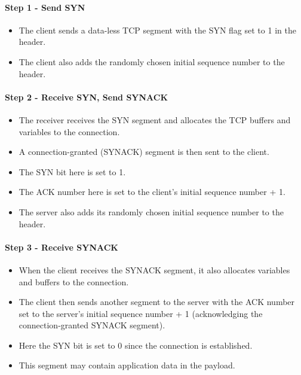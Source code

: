 \documentclass{article}
\begin{document}
\paragraph{Step 1 - Send SYN}

\begin{itemize}
    \item The client sends a data-less TCP segment with the SYN flag set to 1 in the header.
    \item The client also adds the randomly chosen initial sequence number to the header.
\end{itemize}

\paragraph{Step 2 - Receive SYN, Send SYNACK}

\begin{itemize}
    \item The receiver receives the SYN segment and allocates the TCP buffers and variables to the connection.
    \item A connection-granted (SYNACK) segment is then sent to the client.
    \item The SYN bit here is set to 1.
    \item The ACK number here is set to the client's initial sequence number + 1.
    \item The server also adds its randomly chosen initial sequence number to the header.
\end{itemize}

\paragraph{Step 3 - Receive SYNACK}

\begin{itemize}
    \item When the client receives the SYNACK segment, it also allocates variables and buffers to the connection.
    \item The client then sends another segment to the server with the ACK number set to the server's initial sequence number + 1 (acknowledging the connection-granted SYNACK segment).
    \item Here the SYN bit is set to 0 since the connection is established.
    \item This segment may contain application data in the payload.
\end{itemize}
\end{document}
